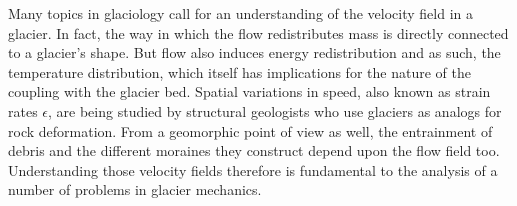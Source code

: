 \documentclass[11pt]{report}
\begin{document}
\newcommand{\fraction}[2]{\raisebox{0.5ex}{#1} \slash \raisebox{-0.5ex}{#2}}

Many topics in glaciology call for an understanding of the velocity field in a glacier. In fact, the way in which the flow redistributes mass is directly connected to a glacier's shape. But flow also induces energy redistribution and as such, the temperature distribution, which itself has implications for the nature of the coupling with the glacier bed. Spatial variations in speed, also known as strain rates $\epsilon$, are being studied by structural geologists who use glaciers as analogs for rock deformation. From a geomorphic point of view as well, the entrainment of debris and the different moraines they construct depend upon the flow field too. Understanding those velocity fields therefore is fundamental to the analysis of a number of problems in glacier mechanics.
\end{document}
